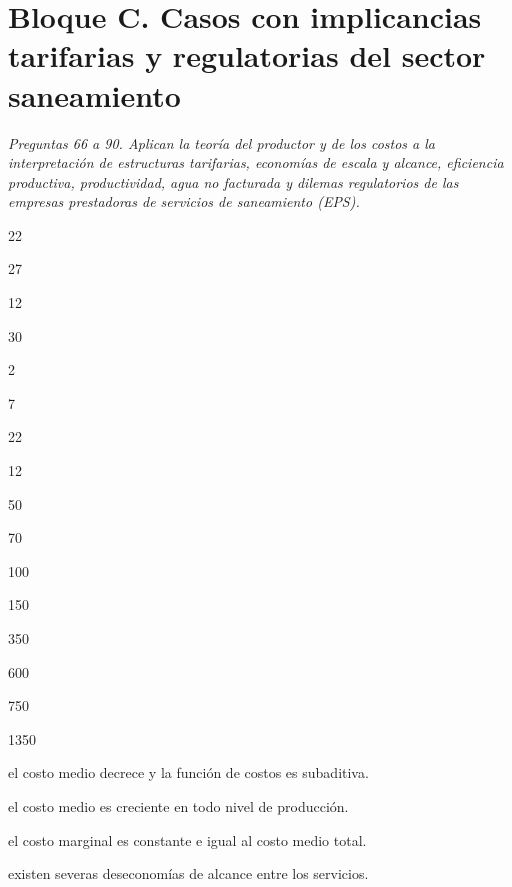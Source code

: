 \section*{Bloque C. Casos con implicancias tarifarias y regulatorias del sector saneamiento}

\noindent\textit{Preguntas 66 a 90. Aplican la teoría del productor y de los costos a la interpretación de estructuras tarifarias, economías de escala y alcance, eficiencia productiva, productividad, agua no facturada y dilemas regulatorios de las empresas prestadoras de servicios de saneamiento (EPS).}

\begin{opts}
    \item 22
    \item 27
    \item 12
    \item 30
\end{opts}

\begin{opts}
    \item 2
    \item 7
    \item 22
    \item 12
\end{opts}

\begin{opts}
    \item 50
    \item 70
    \item 100
    \item 150
\end{opts}

\begin{opts}
    \item 350
    \item 600
    \item 750
    \item 1350
\end{opts}

\begin{opts}
    \item el costo medio decrece y la función de costos es subaditiva.
    \item el costo medio es creciente en todo nivel de producción.
    \item el costo marginal es constante e igual al costo medio total.
    \item existen severas deseconomías de alcance entre los servicios.
\end{opts}

